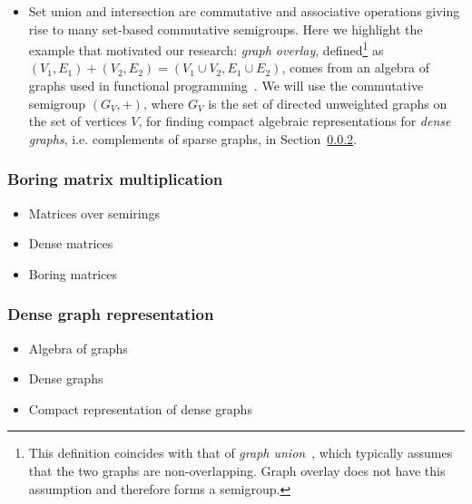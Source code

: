 \documentclass[11pt,letterpaper]{article}
\begin{document}
\begin{itemize}
  \item Set union and intersection are commutative and associative operations
  giving rise to many set-based commutative semigroups. Here we highlight the
  example that motivated our research: \emph{graph overlay},
  defined\footnote{This definition coincides with that of
  \emph{graph union}~\cite{1969_graph_theory_harary}, which typically
  assumes that the two graphs are non-overlapping. Graph overlay does not have
  this assumption and therefore forms a semigroup.} as
  $(V_1, E_1) + (V_2, E_2) = (V_1 \cup V_2, E_1 \cup E_2)$, comes from an
  algebra of graphs used in functional programming~\cite{mokhov2017algebraic}.
  We will use the commutative semigroup $(G_V,+)$, where $G_V$ is the set of
  directed unweighted graphs on the set of vertices $V$, for finding compact
  algebraic representations for \emph{dense graphs}, i.e. complements of sparse
  graphs, in Section~\ref{sec-dense-graph}.
\end{itemize}

\subsubsection{Boring matrix multiplication}\label{sec-boring-matrices}

\begin{itemize}
  \item Matrices over semirings
  \item Dense matrices
  \item Boring matrices
\end{itemize}

\subsubsection{Dense graph representation}\label{sec-dense-graph}

\begin{itemize}
  \item Algebra of graphs
  \item Dense graphs
  \item Compact representation of dense graphs
\end{itemize}

\end{document}
